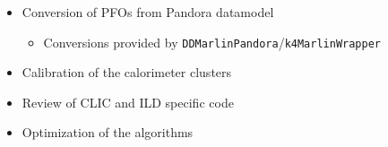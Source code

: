 \documentclass[aspectratio=169]{beamer}
\newcommand{\backupbegin}{
   \newcounter{finalframe}
   \setcounter{finalframe}{\value{framenumber}}
}
\newcommand{\backupend}{
   \setcounter{framenumber}{\value{finalframe}}
}
\newcommand{\redtext}[1]{%
  \textcolor{myRed}{#1}
}
\begin{document}
\begin{frame}
  \begin{itemize}\scriptsize
      \item Conversion of PFOs from Pandora datamodel
          \begin{itemize}\setlength{\itemsep}{.5ex}\scriptsize
            \item Conversions provided by
                  \texttt{DDMarlinPandora}/\texttt{k4MarlinWrapper}
          \end{itemize}
      \item Calibration of the calorimeter clusters
      \item Review of CLIC and ILD specific code
      \item Optimization of the algorithms
  \end{itemize}
\end{frame}


%
%
%
%
%
\end{document}
